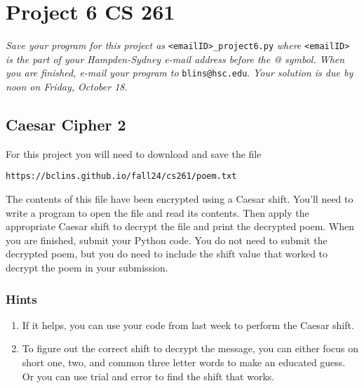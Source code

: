 \documentclass[12pt]{article}
\begin{document}
\section*{Project 6 \hfill CS 261}

\textit{Save your program for this project as} \verb|<emailID>_project6.py| \textit{where} \verb|<emailID>| \textit{is the part of your Hampden-Sydney e-mail address before the @ symbol. When you are finished, e-mail your program to} \verb|blins@hsc.edu|. \textit{Your solution is due by noon on Friday, October 18. }

\subsection*{Caesar Cipher 2}

For this project you will need to download and save the file 
\begin{center}
\verb|https://bclins.github.io/fall24/cs261/poem.txt|
\end{center}
The contents of this file have been encrypted using a Caesar shift. You'll need to write a program to open the file and read its contents.  Then apply the appropriate Caesar shift to decrypt the file and print the decrypted poem.  When you are finished, submit your Python code. You do not need to submit the decrypted poem, but you do need to include the shift value that worked to decrypt the poem in your submission.  

\subsubsection*{Hints}

\begin{enumerate}
\item If it helps, you can use your code from last week to perform the Caesar shift. 

\item To figure out the correct shift to decrypt the message, you can either focus on short one, two, and common three letter words to make an educated guess.  Or you can use trial and error to find the shift that works.  

\end{enumerate}
\end{document}
